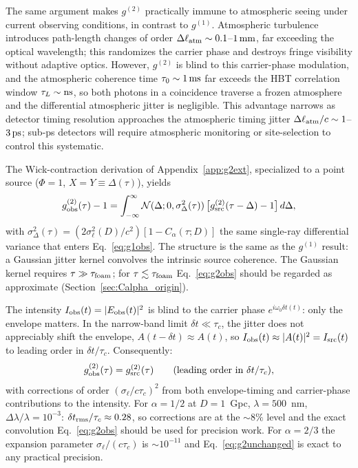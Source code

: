 \documentclass[aps,prd,onecolumn,amsmath,amssymb]{revtex4-2}
\begin{document}
The same argument makes $g^{(2)}$ practically immune to atmospheric seeing under
current observing conditions, in contrast to $g^{(1)}$. Atmospheric turbulence
introduces path-length changes of order $\Delta\ell_{\rm atm} \sim 0.1$--$1\,\rm mm$,
far exceeding the optical wavelength; this randomizes the carrier phase and
destroys fringe visibility without adaptive optics. However, $g^{(2)}$ is blind
to this carrier-phase modulation, and the atmospheric coherence time
$\tau_0 \sim 1\,\rm ms$ far exceeds the HBT correlation window $\tau_L \sim \rm ns$,
so both photons in a coincidence traverse a frozen atmosphere and the differential
atmospheric jitter is negligible. This advantage narrows as detector timing
resolution approaches the atmospheric timing jitter
$\Delta\ell_{\rm atm}/c \sim 1$--$3\,\rm ps$; sub-ps detectors will require
atmospheric monitoring or site-selection to control this systematic.

The Wick-contraction derivation of Appendix~\ref{app:g2ext}, specialized
to a point source ($\Phi = 1$, $X = Y \equiv \Delta(\tau)$), yields
\begin{equation}
  g^{(2)}_{\rm obs}(\tau) - 1
    = \int_{-\infty}^{\infty} \mathcal{N}(\Delta;0,\sigma_\Delta^2(\tau))\,
      \big[g^{(2)}_{\rm src}(\tau-\Delta)-1\big]\,d\Delta,
  \label{eq:g2obs}
\end{equation}
with $\sigma_\Delta^2(\tau) = (2\sigma_\ell^2(D)/c^2)[1-C_\alpha(\tau;D)]$
the same single-ray differential variance that enters Eq.~\eqref{eq:g1obs}.
The structure is the same as the $g^{(1)}$ result: a Gaussian jitter
kernel convolves the intrinsic source coherence. The Gaussian kernel
requires $\tau \gg \tau_{\rm foam}$; for $\tau \lesssim \tau_{\rm foam}$
Eq.~\eqref{eq:g2obs} should be regarded as approximate
(Section~\ref{sec:Calpha_origin}).

The intensity $I_{\rm obs}(t)=|E_{\rm obs}(t)|^2$ is blind to the carrier phase
$e^{i\omega_0\delta t(t)}$: only the envelope matters.
In the narrow-band limit $\delta t \ll \tau_c$, the jitter does not appreciably
shift the envelope, $A(t-\delta t)\approx A(t)$, so
$I_{\rm obs}(t)\approx|A(t)|^2=I_{\rm src}(t)$ to leading order in $\delta t/\tau_c$.
Consequently:
\begin{equation}
  g^{(2)}_{\rm obs}(\tau) = g^{(2)}_{\rm src}(\tau)
  \qquad \text{(leading order in $\delta t/\tau_c$)},
  \label{eq:g2unchanged}
\end{equation}
with corrections of order $(\sigma_\ell/c\tau_c)^2$ from both envelope-timing
and carrier-phase contributions to the intensity.
For $\alpha=1/2$ at $D=1$~Gpc, $\lambda=500$~nm, $\Delta\lambda/\lambda=10^{-3}$:
$\delta t_{\rm rms}/\tau_c \approx 0.28$, so corrections are at the ${\sim}8\%$
level and the exact convolution Eq.~\eqref{eq:g2obs} should be used for precision
work.
For $\alpha=2/3$ the expansion parameter $\sigma_\ell/(c\tau_c)$ is $\sim 10^{-11}$ and
Eq.~\eqref{eq:g2unchanged} is exact to any practical precision.
\end{document}
